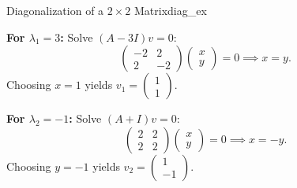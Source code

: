 \begin{example}{Diagonalization of a $2 \times 2$ Matrix}{diag_ex}
    \begin{minipage}[t]{0.48\linewidth}
        \textbf{For $\lambda_1 = 3$:} Solve $(A - 3I)v = 0$:
        \begin{equation*}
            \begin{pmatrix} -2 & 2 \\ 2 & -2 \end{pmatrix}\begin{pmatrix} x \\ y \end{pmatrix} = 0 \implies x = y.
        \end{equation*}
        Choosing $x = 1$ yields $v_1 = \begin{pmatrix} 1 \\ 1 \end{pmatrix}$.
    \end{minipage}\hfill
    \begin{minipage}[t]{0.48\linewidth}
        \textbf{For $\lambda_2 = -1$:} Solve $(A + I)v = 0$:
        \begin{equation*}
            \begin{pmatrix} 2 & 2 \\ 2 & 2 \end{pmatrix}\begin{pmatrix} x \\ y \end{pmatrix} = 0 \implies x = -y.
        \end{equation*}
        Choosing $y = -1$ yields $v_2 = \begin{pmatrix} 1 \\ -1 \end{pmatrix}$.
    \end{minipage}
    \vspace{0.2cm}
    

\end{example}
